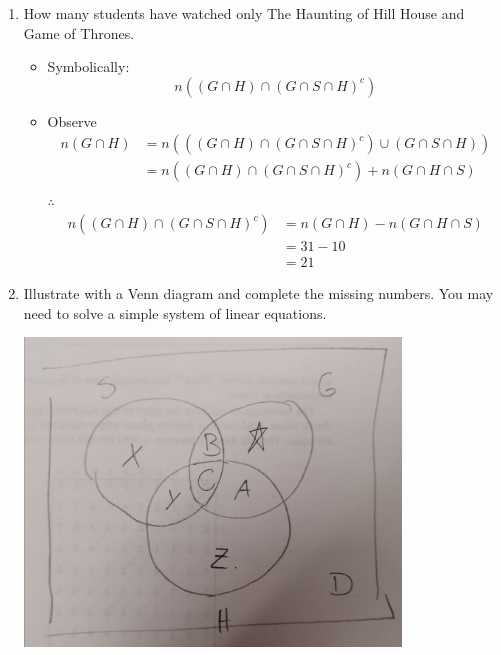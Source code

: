 \documentclass[11pt]{book}
\begin{document}
\begin{enumerate}[label=\alph*)]
    \item How many students have watched only The Haunting of Hill House  and Game of Thrones.
        \begin{itemize}
            \item Symbolically:
                \[
                    n\left(\left( G\cap H \right) \cap \left( G\cap S\cap H \right) ^{c} \right) 
                \]
            \item Observe 
                \begin{align*}
                    n\left(G\cap H\right) &=n\left(\left( \left( G\cap H \right) \cap \left( G\cap S\cap H \right) ^{c}  \right) \cup \left( G\cap S\cap H \right) \right) \\
                    &= n\left(\left( G\cap H \right) \cap \left( G\cap S\cap H \right) ^{c} \right)  + n\left(G\cap H\cap S\right)  \tag{Axiom 3} \\ 
                \end{align*}
            $\therefore $ 
                \begin{align*}
                    n\left(\left( G\cap H \right) \cap \left( G\cap S\cap H \right) ^{c} \right) &= n\left(G\cap H\right)  - n\left(G\cap H\cap S\right) \\
                    &= 31  - 10\\ 
                    &= 21  
                \end{align*}
        \end{itemize}
    \item Illustrate with a Venn diagram and complete the missing numbers. You may need to solve a simple system of linear equations.
        \begin{center}
            \includegraphics[width=100mm]{assets/lec2_movie.jpg} 

\end{center}
\end{enumerate}
\end{document}
